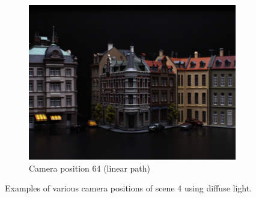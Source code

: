 \documentclass[thesis.tex]{subfiles}
\begin{document}
\begin{figure}[tb]
\begin{subfigure}[t]{0.32\textwidth}
		\includegraphics[width=\textwidth]{img/scene_04_img64_00.png}
		\caption{Camera position 64 (linear path)}
		\label{fig:viewpoint_example_scale}
	\end{subfigure}
	\caption{Examples of various camera positions of scene 4 using diffuse light.}
	\label{fig:viewpoint_example}
\end{figure}
%
\end{document}

